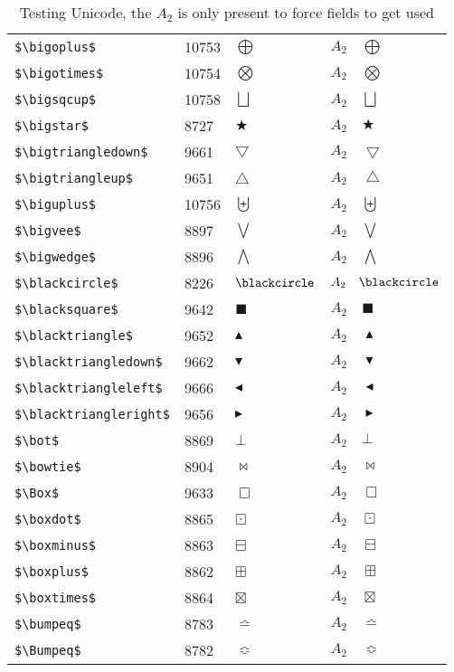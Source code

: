 \documentclass{article}
\begin{document}
\begin{table}
\begin{center}
\begin{tabular}{llll}
 \verb#$\bigoplus$#          & 10753 & $\bigoplus$           & $A_2\quad \bigoplus$\\
 \verb#$\bigotimes$#         & 10754 & $\bigotimes$          & $A_2\quad \bigotimes$\\
 \verb#$\bigsqcup$#          & 10758 & $\bigsqcup$           & $A_2\quad \bigsqcup$\\
 \verb#$\bigstar$#            & 8727 & $\bigstar$            & $A_2\quad \bigstar$\\
 \verb#$\bigtriangledown$#    & 9661 & $\bigtriangledown$    & $A_2\quad \bigtriangledown$\\
 \verb#$\bigtriangleup$#      & 9651 & $\bigtriangleup$      & $A_2\quad \bigtriangleup$\\
 \verb#$\biguplus$#          & 10756 & $\biguplus$           & $A_2\quad \biguplus$\\
 \verb#$\bigvee$#             & 8897 & $\bigvee$             & $A_2\quad \bigvee$\\
 \verb#$\bigwedge$#           & 8896 & $\bigwedge$           & $A_2\quad \bigwedge$\\
 \verb#$\blackcircle$#        & 8226 & $\blackcircle$        & $A_2\quad \blackcircle$\\
 \verb#$\blacksquare$#        & 9642 & $\blacksquare$        & $A_2\quad \blacksquare$\\
 \verb#$\blacktriangle$#      & 9652 & $\blacktriangle$      & $A_2\quad \blacktriangle$\\
 \verb#$\blacktriangledown$#  & 9662 & $\blacktriangledown$  & $A_2\quad \blacktriangledown$\\
 \verb#$\blacktriangleleft$#  & 9666 & $\blacktriangleleft$  & $A_2\quad \blacktriangleleft$\\
 \verb#$\blacktriangleright$# & 9656 & $\blacktriangleright$ & $A_2\quad \blacktriangleright$\\
 \verb#$\bot$#                & 8869 & $\bot$                & $A_2\quad \bot$\\
 \verb#$\bowtie$#             & 8904 & $\bowtie$             & $A_2\quad \bowtie$\\
 \verb#$\Box$#                & 9633 & $\Box$                & $A_2\quad \Box$\\
 \verb#$\boxdot$#             & 8865 & $\boxdot$             & $A_2\quad \boxdot$\\
 \verb#$\boxminus$#           & 8863 & $\boxminus$           & $A_2\quad \boxminus$\\
 \verb#$\boxplus$#            & 8862 & $\boxplus$            & $A_2\quad \boxplus$\\
 \verb#$\boxtimes$#           & 8864 & $\boxtimes$           & $A_2\quad \boxtimes$\\
 \verb#$\bumpeq$#             & 8783 & $\bumpeq$             & $A_2\quad \bumpeq$\\
 \verb#$\Bumpeq$#             & 8782 & $\Bumpeq$             & $A_2\quad \Bumpeq$\\
\end{tabular}
\end{center}
\caption{Testing Unicode, the $A_2$ is only present to force fields to get used}
\end{table}
\end{document}
